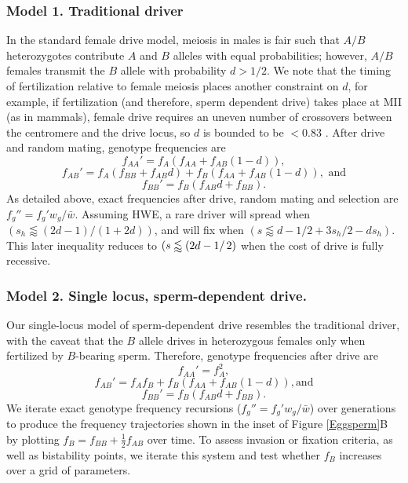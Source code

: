 \documentclass[12pt,letterpaper]{article}
\begin{document}
\subsubsection*{Model 1. Traditional driver}
In the standard female drive model, meiosis in males is fair such that $A/B$ heterozygotes contribute $A$ and $B$ alleles with equal probabilities; however, $A/B$ females transmit the $B$ allele with probability $d>1/2$.  
We note that the timing of fertilization relative to female meiosis places another constraint on $d$, for example, if fertilization (and therefore, sperm dependent drive) takes place at MII (as in mammals),
	female drive requires an uneven number of crossovers between the centromere and the drive locus, 
	so $d$ is bounded to be $<0.83$ \citep[see ][ for discussion]{Buckler1999}. 
After drive and random mating, genotype frequencies are 
	$$f_{AA}'=f_A (f_{AA }+ f_{AB} (1 - d)),$$ 
	$$f_{AB}'=f_A (f_{BB} + f_{AB}d) + f_B (f_{AA} + f_{AB} (1 - d)),\text{ and}$$
	$$f_{BB}'= f_B (f_{AB} d + f_{BB}).$$ 
As detailed above, exact frequencies after drive, random mating and selection are $f_g''= f_g'w_g/\bar{w}$. 
Assuming HWE, a rare driver will spread when $\left(s_h
        \lessapprox \left(2d-1 \right)/\left(1+2d\right)\right)$, and will fix when $\left( s\lessapprox d -1/2 +
        3 s_h /2- d s_h \right) $. This later inequality reduces to
        $\left( s\lessapprox\left(2d-1\right/2 \right)$ when the cost of drive is fully
        recessive. 
	
\subsubsection*{Model 2. Single locus, sperm-dependent drive.}
Our single-locus model of sperm-dependent drive resembles the traditional driver, with the caveat that the $B$ allele drives in heterozygous females only when fertilized by $B$-bearing sperm. 
Therefore, genotype frequencies after drive are 
	$$f_{AA}'=f_A^2 , $$
	$$f_{AB}'=f_A f_B+f_B (f_{AA} + f_{AB}(1 - d)), \text{and} $$
	$$f_{BB}'= f_B (f_{AB} d + f_{BB} ).$$
We iterate exact genotype frequency recursions ($f_g''= f_g'w_g/\bar{w}$) over generations to produce the frequency trajectories shown in the inset of 
Figure \ref{Eggsperm}B by plotting $f_B=f_{BB}+ \frac{1}{2}f_{AB}$
over time. %
To assess invasion or fixation criteria, as well as bistability points, we iterate this system and
test whether $f_B$ increases over a grid of parameters. 
\end{document}
